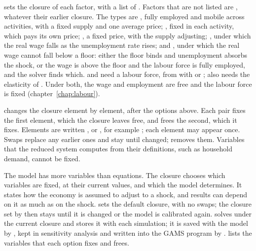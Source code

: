 \begin{optdesc}
\item[\optarg{fac}{tors}{spec}] sets the closure of each factor, with
 a list of \cmd{:}. Factors that are not
listed are , whatever their earlier closure. The types are
, fully employed and mobile across activities, with a fixed supply
and one average price; , fixed in each activity, which pays its
own price; , a fixed price, with the supply adjusting;
, under which the real wage falls as the unemployment rate
rises; and , under which the real wage cannot fall below a floor:
either the floor binds and unemployment absorbs the shock, or the wage is
above the floor and the labour force is fully employed, and the solver finds
which.  and  need a labour force, from
 with  or ;
 also needs the elasticity of . Under both,
the wage and employment are free and the labour force is fixed
(chapter~\ref{chap:labour}).

\item[\optarg{}{swap}{fix free \textup{[}fix free \dots\textup{]}}] changes the
closure element by element, after the options above. Each pair fixes the first
element, which the closure leaves free, and frees the second, which it fixes.
Elements are written , \cmd{(}\cmd{)} or
\cmd{(}\cmd{,}\cmd{)}, for example ;
each element may appear once. Swaps replace any earlier ones and stay until
changed;  removes them. Variables that the reduced system
computes from their definitions, such as household demand, cannot be fixed.
\end{optdesc}


The model has more variables than equations. The closure chooses which
variables are fixed, at their current values, and which the model determines.
It states how the economy is assumed to adjust to a shock, and results can
depend on it as much as on the shock.  sets the default
closure, with no swaps; the closure set by  then stays until it
is changed or the model is calibrated again.  solves under
the current closure and stores it with each simulation; it is saved with the
model by , kept in sensitivity analysis and written into the
GAMS program by .  lists the variables
that each option fixes and frees.

